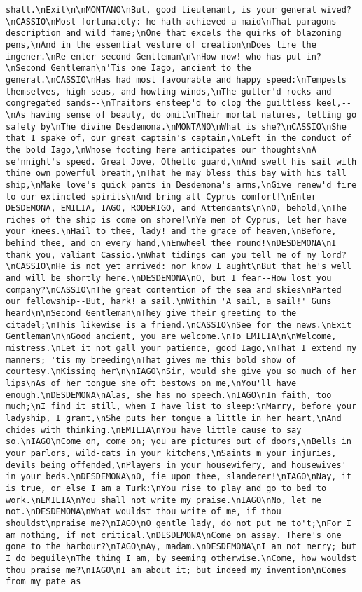 \begin{verbatim}
shall.\nExit\n\nMONTANO\nBut, good lieutenant, is your general wived?\nCASSIO\nMost fortunately: he hath achieved a maid\nThat paragons description and wild fame;\nOne that excels the quirks of blazoning pens,\nAnd in the essential vesture of creation\nDoes tire the ingener.\nRe-enter second Gentleman\n\nHow now! who has put in?\nSecond Gentleman\n'Tis one Iago, ancient to the general.\nCASSIO\nHas had most favourable and happy speed:\nTempests themselves, high seas, and howling winds,\nThe gutter'd rocks and congregated sands--\nTraitors ensteep'd to clog the guiltless keel,--\nAs having sense of beauty, do omit\nTheir mortal natures, letting go safely by\nThe divine Desdemona.\nMONTANO\nWhat is she?\nCASSIO\nShe that I spake of, our great captain's captain,\nLeft in the conduct of the bold Iago,\nWhose footing here anticipates our thoughts\nA se'nnight's speed. Great Jove, Othello guard,\nAnd swell his sail with thine own powerful breath,\nThat he may bless this bay with his tall ship,\nMake love's quick pants in Desdemona's arms,\nGive renew'd fire to our extincted spirits\nAnd bring all Cyprus comfort!\nEnter DESDEMONA, EMILIA, IAGO, RODERIGO, and Attendants\n\nO, behold,\nThe riches of the ship is come on shore!\nYe men of Cyprus, let her have your knees.\nHail to thee, lady! and the grace of heaven,\nBefore, behind thee, and on every hand,\nEnwheel thee round!\nDESDEMONA\nI thank you, valiant Cassio.\nWhat tidings can you tell me of my lord?\nCASSIO\nHe is not yet arrived: nor know I aught\nBut that he's well and will be shortly here.\nDESDEMONA\nO, but I fear--How lost you company?\nCASSIO\nThe great contention of the sea and skies\nParted our fellowship--But, hark! a sail.\nWithin 'A sail, a sail!' Guns heard\n\nSecond Gentleman\nThey give their greeting to the citadel;\nThis likewise is a friend.\nCASSIO\nSee for the news.\nExit Gentleman\n\nGood ancient, you are welcome.\nTo EMILIA\n\nWelcome, mistress.\nLet it not gall your patience, good Iago,\nThat I extend my manners; 'tis my breeding\nThat gives me this bold show of courtesy.\nKissing her\n\nIAGO\nSir, would she give you so much of her lips\nAs of her tongue she oft bestows on me,\nYou'll have enough.\nDESDEMONA\nAlas, she has no speech.\nIAGO\nIn faith, too much;\nI find it still, when I have list to sleep:\nMarry, before your ladyship, I grant,\nShe puts her tongue a little in her heart,\nAnd chides with thinking.\nEMILIA\nYou have little cause to say so.\nIAGO\nCome on, come on; you are pictures out of doors,\nBells in your parlors, wild-cats in your kitchens,\nSaints m your injuries, devils being offended,\nPlayers in your housewifery, and housewives' in your beds.\nDESDEMONA\nO, fie upon thee, slanderer!\nIAGO\nNay, it is true, or else I am a Turk:\nYou rise to play and go to bed to work.\nEMILIA\nYou shall not write my praise.\nIAGO\nNo, let me not.\nDESDEMONA\nWhat wouldst thou write of me, if thou shouldst\npraise me?\nIAGO\nO gentle lady, do not put me to't;\nFor I am nothing, if not critical.\nDESDEMONA\nCome on assay. There's one gone to the harbour?\nIAGO\nAy, madam.\nDESDEMONA\nI am not merry; but I do beguile\nThe thing I am, by seeming otherwise.\nCome, how wouldst thou praise me?\nIAGO\nI am about it; but indeed my invention\nComes from my pate as 
\end{verbatim}
